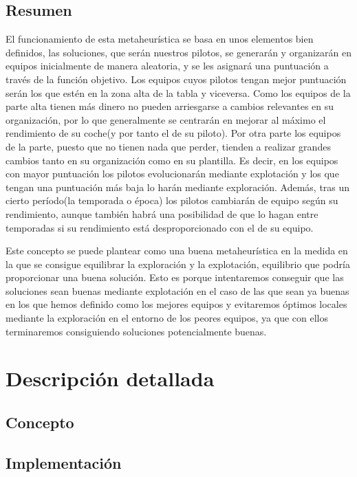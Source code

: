 \documentclass{article}
\begin{document}
	\subsection{Resumen}
	\indent El funcionamiento de esta metaheurística se basa en unos elementos bien definidos, las soluciones, que serán nuestros pilotos, se generarán y organizarán en equipos inicialmente de manera aleatoria, y se les asignará una puntuación a través de la función objetivo. Los equipos cuyos pilotos tengan mejor puntuación serán los que estén en la zona alta de la tabla y viceversa. Como los equipos de la parte alta tienen más dinero no pueden arriesgarse a cambios relevantes en su organización, por lo que generalmente se centrarán en mejorar al máximo el rendimiento de su coche(y por tanto el de su piloto). Por otra parte los equipos de la parte, puesto que no tienen nada que perder, tienden a realizar grandes cambios tanto en su organización como en su plantilla. Es decir, en los equipos con mayor puntuación los pilotos evolucionarán mediante explotación y los que tengan una puntuación más baja lo harán mediante exploración. Además, tras un cierto período(la temporada o época) los pilotos cambiarán de equipo según su rendimiento, aunque también habrá una posibilidad de que lo hagan entre temporadas si su rendimiento está desproporcionado con el de su equipo.
	\par
	Este concepto se puede plantear como una buena metaheurística en la medida en la que se consigue equilibrar la exploración y la explotación, equilibrio que podría proporcionar una buena solución. Esto es porque intentaremos conseguir que las soluciones sean buenas mediante explotación en el caso de las que sean ya buenas en los que hemos definido como los mejores equipos y evitaremos óptimos locales mediante la exploración en el entorno de los peores equipos, ya que con ellos terminaremos consiguiendo soluciones potencialmente buenas.
	
	\section {Descripción detallada}
	\subsection{Concepto}
	
	\subsection{Implementación}
	
\end{document}
